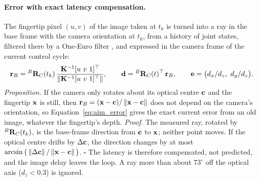 \paragraph{Error with exact latency compensation.} The fingertip pixel $(u,v)$ of the image taken
at $t_k$ is turned into a ray in the base frame with the camera orientation at $t_k$, from a
history of joint states, filtered there by a One-Euro filter \cite{casiez2012oneeuro}, and
expressed in the camera frame of the current control cycle:
\begin{equation}
\vect{r}_B = \Rf{B}{C}(t_k)\,\frac{\mathbf{K}^{-1}[u\ v\ 1]^{\top}}{\norm{\mathbf{K}^{-1}[u\ v\ 1]^{\top}}},
\qquad
\vect{d} = \Rf{B}{C}(t)^{\top}\,\vect{r}_B,
\qquad
\vect{e} = \big(d_x/d_z,\ d_y/d_z\big).
\label{eq:aim_error}
\end{equation}
\textit{Proposition.} If the camera only rotates about its optical centre $\mathbf{c}$ and the
fingertip $\mathbf{x}$ is still, then $\mathbf{r}_B=(\mathbf{x}-\mathbf{c})/\left\lVert\mathbf{x}-\mathbf{c}\right\rVert$ does
not depend on the camera's orientation, so Equation~\ref{eq:aim_error} gives the exact current
error from an old image, whatever the fingertip's depth. \textit{Proof.} The measured ray, rotated
by ${}^{B}\mathbf{R}_{C}(t_k)$, is the base-frame direction from $\mathbf{c}$ to $\mathbf{x}$; neither point
moves. If the optical centre drifts by $\Delta\mathbf{c}$, the direction changes by at most
$\arcsin\big(\left\lVert\Delta\mathbf{c}\right\rVert/\left\lVert\mathbf{x}-\mathbf{c}\right\rVert\big)$. $\square$ The latency is therefore
compensated, not predicted, and the image delay leaves the loop. A ray more than about $73^\circ$
off the optical axis ($d_z<0.3$) is ignored.

